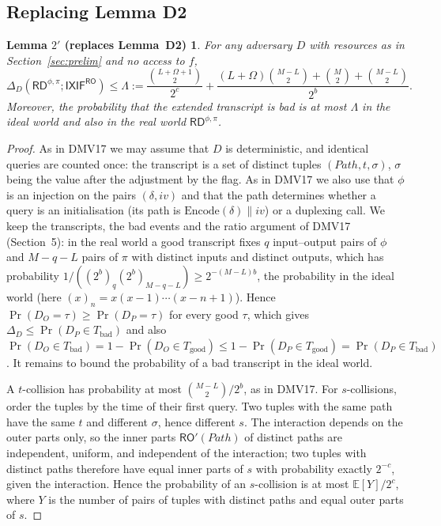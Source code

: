 \documentclass[11pt,a4paper]{article}
\newtheorem*{lemtwop}{Lemma $2'$ {\normalfont (replaces Lemma~D2)}}
\theoremstyle{definition}
\theoremstyle{remark}
\newcommand{\RD}{\mathsf{RD}}
\newcommand{\IXIF}{\mathsf{IXIF}}
\newcommand{\RO}{\mathsf{RO}}
\newcommand{\Path}{\mathit{Path}}
\newcommand{\E}{\mathbb{E}}
\begin{document}
\subsection{Replacing Lemma D2}
\begin{lemtwop}
For any adversary $D$ with resources as in Section~\ref{sec:prelim} and no access to $f$,
\[ \Delta_D(\RD^{\phi,\pi} ; \IXIF^{\RO}) \le \Lambda := \frac{\binom{L+\Omega+1}{2}}{2^c}
 + \frac{(L+\Omega)\binom{M-L}{2} + \binom{M}{2} + \binom{M-L}{2}}{2^b} . \]
Moreover, the probability that the extended transcript is bad is at most $\Lambda$ in the ideal world and also in the
real world $\RD^{\phi,\pi}$.
\end{lemtwop}
\begin{proof}
As in DMV17 we may assume that $D$ is deterministic, and identical queries are counted once: the transcript is a
set of distinct tuples $(\Path, t, \sigma)$, $\sigma$ being the value after the adjustment by the flag. As in DMV17 we also use
that $\phi$ is an injection on the pairs $(\delta, iv)$ and that the path determines whether a query is an initialisation
(its path is $\mathrm{Encode}(\delta) \| iv$) or a duplexing call.
We keep the transcripts, the bad events and the ratio argument of DMV17 (Section~5): in the real world a good
transcript fixes $q$ input--output pairs of $\phi$ and $M - q - L$ pairs of $\pi$ with distinct inputs and distinct outputs,
which has probability $1/((2^b)_q (2^b)_{M-q-L}) \ge 2^{-(M-L)b}$, the probability in the ideal world
(here $(x)_n = x(x-1)\cdots(x-n+1)$). Hence
$\Pr(D_O = \tau) \ge \Pr(D_P = \tau)$ for every good $\tau$, which gives $\Delta_D \le \Pr(D_P \in T_{\mathrm{bad}})$ and also
$\Pr(D_O \in T_{\mathrm{bad}}) = 1 - \Pr(D_O \in T_{\mathrm{good}}) \le 1 - \Pr(D_P \in T_{\mathrm{good}}) = \Pr(D_P \in T_{\mathrm{bad}})$.
It remains to bound the probability of a bad transcript in the ideal world.

A $t$-collision has probability at most $\binom{M-L}{2}/2^b$, as in DMV17. For $s$-collisions, order the tuples by
the time of their first query. Two tuples with the same path have the same $t$ and different $\sigma$, hence different
$s$. The interaction depends on the outer parts only, so the inner parts $\RO'(\Path)$ of distinct paths are
independent, uniform, and independent of the interaction; two tuples with distinct paths therefore have equal inner
parts of $s$ with probability exactly $2^{-c}$, given the interaction. Hence the probability of an $s$-collision is
at most $\E[Y]/2^c$, where $Y$ is the number of pairs of tuples with distinct paths and equal outer parts of $s$.


\end{proof}
\end{document}
